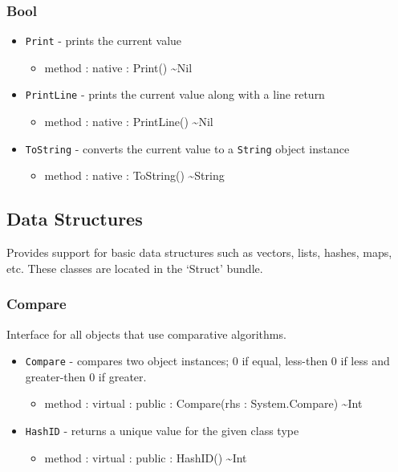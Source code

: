 \documentclass[11pt]{article}
\begin{document}
\subsubsection{Bool}
\begin{itemize}
\item \texttt{Print} - prints the current value
  \begin{itemize}
  \item method : native : Print() \textasciitilde Nil
  \end{itemize}
\item \texttt{PrintLine} - prints the current value along with a line
  return
  \begin{itemize}
  \item method : native : PrintLine() \textasciitilde Nil
  \end{itemize}
\item \texttt{ToString} - converts the current value to a
  \texttt{String} object instance
  \begin{itemize}
  \item method : native : ToString() \textasciitilde String
  \end{itemize}
\end{itemize}
 
\subsection{Data Structures}
Provides support for basic data structures such as vectors, lists,
hashes, maps, etc.  These classes are located in the `Struct'
bundle.

\subsubsection{Compare}
Interface for all objects that use comparative algorithms.
\begin{itemize}
\item \texttt{Compare} - compares two object instances; 0 if equal,
  less-then 0 if less and greater-then 0 if greater.
  \begin{itemize}
  \item method : virtual : public : Compare(rhs : System.Compare) \textasciitilde Int
  \end{itemize}
\item \texttt{HashID} - returns a unique value for the given class
  type
  \begin{itemize}
  \item method : virtual : public : HashID() \textasciitilde Int
  \end{itemize}
\end{itemize}
\end{document}

